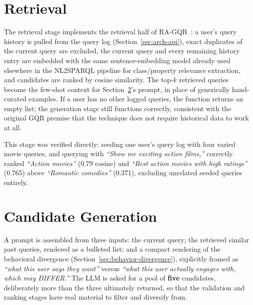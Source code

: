 \section{Retrieval}
\label{sec:rec-retrieval}

The retrieval stage implements the retrieval half of RA-GQR~\cite{bacciu2024}: a user's query
history is pulled from the query log (Section~\ref{sec:arch-api}), exact duplicates of the current
query are excluded, the current query and every remaining history entry are embedded with the same
sentence-embedding model already used elsewhere in the NL2SPARQL pipeline for class/property
relevance extraction, and candidates are ranked by cosine similarity. The top-$k$ retrieved queries
become the few-shot context for Section~\ref{sec:rec-generation}'s prompt, in place of generically
hand-curated examples. If a user has no other logged queries, the function returns an empty list;
the generation stage still functions correctly, consistent with the original GQR premise that the
technique does not require historical data to work at all.

This stage was verified directly: seeding one user's query log with four varied movie queries, and
querying with \emph{``Show me exciting action films,''} correctly ranked \emph{``Action movies''}
(0.79 cosine) and \emph{``Best action movies with high ratings''} (0.765) above \emph{``Romantic
comedies''} (0.371), excluding unrelated seeded queries entirely.

\section{Candidate Generation}
\label{sec:rec-generation}

A prompt is assembled from three inputs: the current query; the retrieved similar past queries,
rendered as a bulleted list; and a compact rendering of the behavioral divergence
(Section~\ref{sec:behavior-divergence}), explicitly framed as \emph{``what this user says they
want''} versus \emph{``what this user actually engages with, which may DIFFER.''} The LLM is asked
for a pool of \textbf{five} candidates, deliberately more than the three ultimately returned, so
that the validation and ranking stages have real material to filter and diversify from.

